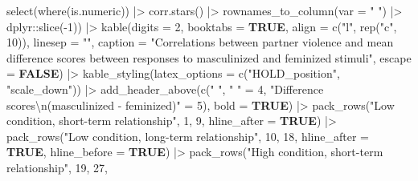 \documentclass[
  bookmarksnumbered]{article}
\newenvironment{Shaded}{\begin{snugshade}}{\end{snugshade}}
\newcommand{\AttributeTok}[1]{\textcolor[rgb]{0.80,0.80,0.80}{#1}}
\newcommand{\ConstantTok}[1]{\textcolor[rgb]{0.86,0.64,0.64}{\textbf{#1}}}
\newcommand{\DecValTok}[1]{\textcolor[rgb]{0.86,0.86,0.80}{#1}}
\newcommand{\FunctionTok}[1]{\textcolor[rgb]{0.94,0.94,0.56}{#1}}
\newcommand{\NormalTok}[1]{\textcolor[rgb]{0.80,0.80,0.80}{#1}}
\newcommand{\OtherTok}[1]{\textcolor[rgb]{0.94,0.94,0.56}{#1}}
\newcommand{\SpecialCharTok}[1]{\textcolor[rgb]{0.86,0.64,0.64}{#1}}
\newcommand{\StringTok}[1]{\textcolor[rgb]{0.80,0.58,0.58}{#1}}
\begin{document}
\begin{Shaded}
\begin{Highlighting}[]
              \FunctionTok{select}\NormalTok{(}\FunctionTok{where}\NormalTok{(is.numeric)) }\SpecialCharTok{|\textgreater{}} 
              \FunctionTok{corr.stars}\NormalTok{() }\SpecialCharTok{|\textgreater{}}
              \FunctionTok{rownames\_to\_column}\NormalTok{(}\AttributeTok{var =} \StringTok{" "}\NormalTok{) }\SpecialCharTok{|\textgreater{}} 
\NormalTok{              dplyr}\SpecialCharTok{::}\FunctionTok{slice}\NormalTok{(}\SpecialCharTok{{-}}\DecValTok{1}\NormalTok{)) }\SpecialCharTok{|\textgreater{}} 
  \FunctionTok{kable}\NormalTok{(}\AttributeTok{digits =} \DecValTok{2}\NormalTok{,}
        \AttributeTok{booktabs =} \ConstantTok{TRUE}\NormalTok{,}
        \AttributeTok{align =} \FunctionTok{c}\NormalTok{(}\StringTok{"l"}\NormalTok{, }\FunctionTok{rep}\NormalTok{(}\StringTok{"c"}\NormalTok{, }\DecValTok{10}\NormalTok{)),}
        \AttributeTok{linesep =} \StringTok{""}\NormalTok{,}
        \AttributeTok{caption =} \StringTok{"Correlations between partner violence and mean difference scores between }
\StringTok{        responses to masculinized and feminized stimuli"}\NormalTok{,}
        \AttributeTok{escape =} \ConstantTok{FALSE}\NormalTok{) }\SpecialCharTok{|\textgreater{}}
  \FunctionTok{kable\_styling}\NormalTok{(}\AttributeTok{latex\_options =} \FunctionTok{c}\NormalTok{(}\StringTok{"HOLD\_position"}\NormalTok{, }\StringTok{"scale\_down"}\NormalTok{)) }\SpecialCharTok{|\textgreater{}}
  \FunctionTok{add\_header\_above}\NormalTok{(}\FunctionTok{c}\NormalTok{(}\StringTok{" "}\NormalTok{,}
                     \StringTok{" "} \OtherTok{=} \DecValTok{4}\NormalTok{, }
                     \StringTok{"Difference scores}\SpecialCharTok{\textbackslash{}n}\StringTok{(masculinized {-} feminized)"} \OtherTok{=} \DecValTok{5}\NormalTok{),}
                   \AttributeTok{bold =} \ConstantTok{TRUE}\NormalTok{) }\SpecialCharTok{|\textgreater{}}
  \FunctionTok{pack\_rows}\NormalTok{(}\StringTok{"Low condition, short{-}term relationship"}\NormalTok{, }\DecValTok{1}\NormalTok{, }\DecValTok{9}\NormalTok{,}
            \AttributeTok{hline\_after =} \ConstantTok{TRUE}\NormalTok{) }\SpecialCharTok{|\textgreater{}} 
  \FunctionTok{pack\_rows}\NormalTok{(}\StringTok{"Low condition, long{-}term relationship"}\NormalTok{, }\DecValTok{10}\NormalTok{, }\DecValTok{18}\NormalTok{,}
            \AttributeTok{hline\_after =} \ConstantTok{TRUE}\NormalTok{, }\AttributeTok{hline\_before =} \ConstantTok{TRUE}\NormalTok{) }\SpecialCharTok{|\textgreater{}}
  \FunctionTok{pack\_rows}\NormalTok{(}\StringTok{"High condition, short{-}term relationship"}\NormalTok{, }\DecValTok{19}\NormalTok{, }\DecValTok{27}\NormalTok{,}

\end{Highlighting}
\end{Shaded}
\end{document}
